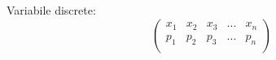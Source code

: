 \documentclass{article}
\begin{document}
Variabile discrete:
\[
  \begin{pmatrix}
    x_1 & x_2 & x_3 & \ldots & x_n \\
    p_1 & p_2 & p_3 & \ldots & p_n \\
  \end{pmatrix}
\]
\end{document}
